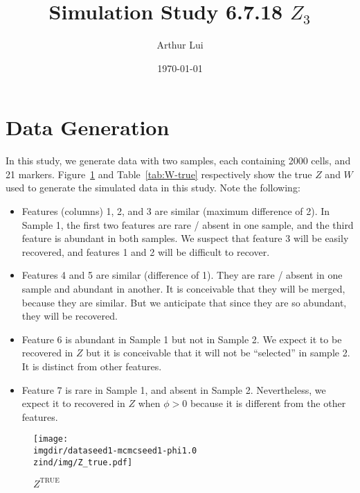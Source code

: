 \documentclass[10pt]{article} %
\title{Simulation Study 6.7.18 $Z_3$}
\author{Arthur Lui}
\date{\today} %
\def\true{\text{TRUE}}
\def\imgdir{../../../results/test-sim-6-7-18}
\def\zind{-Zind3}
\begin{document}
\maketitle



\section{Data Generation}\label{sec:data-generation}
In this study, we generate data with two samples, each containing 2000 cells,
and 21 markers. Figure~\ref{fig:Z-true} and Table~\ref{tab:W-true}
respectively show the true $Z$ and $W$ used to generate the simulated data in
this study. Note the following:
\begin{itemize}
  \item Features (columns) 1, 2, and 3 are similar (maximum difference of 2).
    In Sample 1, the first two features are rare / absent in one sample, and
    the third feature is abundant in both samples. We suspect that feature 3 will
    be easily recovered, and features 1 and 2 will be difficult to recover.
  \item Features 4 and 5 are similar (difference of 1). They are rare /
    absent in one sample and abundant in another. It is conceivable that they
    will be merged, because they are similar. But we anticipate that since
    they are so abundant, they will be recovered.
  \item Feature 6 is abundant in Sample 1 but not in Sample 2. We expect it to be
    recovered in $Z$ but it is conceivable that it will not be ``selected'' in sample
    2. It is distinct from other features.
  \item Feature 7 is rare in Sample 1, and absent in Sample 2. Nevertheless,
    we expect it to recovered in $Z$ when $\phi > 0$ because it is different
    from the other features.
\end{itemize}

\begin{figure}[H]
  \begin{center}  %
    \texttt{[image: \\imgdir/dataseed1-mcmcseed1-phi1.0\\zind/img/Z\_true.pdf]}
  \end{center}
  \caption{$Z^\true$}
  \label{fig:Z-true}
\end{figure}
\end{document}
